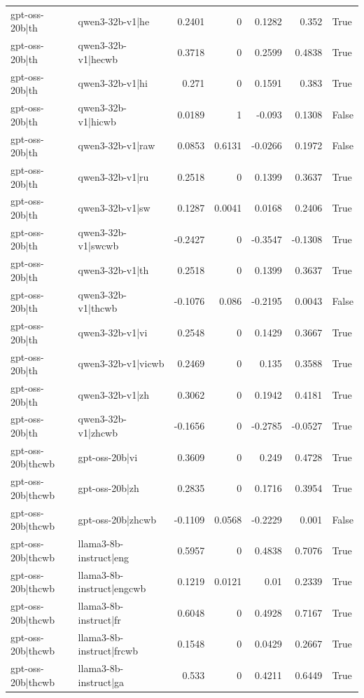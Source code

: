 \begin{table}
\begin{tabular}{l l r r r r l}
gpt-oss-20b|th & qwen3-32b-v1|he & 0.2401 & 0 & 0.1282 & 0.352 & True \\
gpt-oss-20b|th & qwen3-32b-v1|hecwb & 0.3718 & 0 & 0.2599 & 0.4838 & True \\
gpt-oss-20b|th & qwen3-32b-v1|hi & 0.271 & 0 & 0.1591 & 0.383 & True \\
gpt-oss-20b|th & qwen3-32b-v1|hicwb & 0.0189 & 1 & -0.093 & 0.1308 & False \\
gpt-oss-20b|th & qwen3-32b-v1|raw & 0.0853 & 0.6131 & -0.0266 & 0.1972 & False \\
gpt-oss-20b|th & qwen3-32b-v1|ru & 0.2518 & 0 & 0.1399 & 0.3637 & True \\
gpt-oss-20b|th & qwen3-32b-v1|sw & 0.1287 & 0.0041 & 0.0168 & 0.2406 & True \\
gpt-oss-20b|th & qwen3-32b-v1|swcwb & -0.2427 & 0 & -0.3547 & -0.1308 & True \\
gpt-oss-20b|th & qwen3-32b-v1|th & 0.2518 & 0 & 0.1399 & 0.3637 & True \\
gpt-oss-20b|th & qwen3-32b-v1|thcwb & -0.1076 & 0.086 & -0.2195 & 0.0043 & False \\
gpt-oss-20b|th & qwen3-32b-v1|vi & 0.2548 & 0 & 0.1429 & 0.3667 & True \\
gpt-oss-20b|th & qwen3-32b-v1|vicwb & 0.2469 & 0 & 0.135 & 0.3588 & True \\
gpt-oss-20b|th & qwen3-32b-v1|zh & 0.3062 & 0 & 0.1942 & 0.4181 & True \\
gpt-oss-20b|th & qwen3-32b-v1|zhcwb & -0.1656 & 0 & -0.2785 & -0.0527 & True \\
gpt-oss-20b|thcwb & gpt-oss-20b|vi & 0.3609 & 0 & 0.249 & 0.4728 & True \\
gpt-oss-20b|thcwb & gpt-oss-20b|zh & 0.2835 & 0 & 0.1716 & 0.3954 & True \\
gpt-oss-20b|thcwb & gpt-oss-20b|zhcwb & -0.1109 & 0.0568 & -0.2229 & 0.001 & False \\
gpt-oss-20b|thcwb & llama3-8b-instruct|eng & 0.5957 & 0 & 0.4838 & 0.7076 & True \\
gpt-oss-20b|thcwb & llama3-8b-instruct|engcwb & 0.1219 & 0.0121 & 0.01 & 0.2339 & True \\
gpt-oss-20b|thcwb & llama3-8b-instruct|fr & 0.6048 & 0 & 0.4928 & 0.7167 & True \\
gpt-oss-20b|thcwb & llama3-8b-instruct|frcwb & 0.1548 & 0 & 0.0429 & 0.2667 & True \\
gpt-oss-20b|thcwb & llama3-8b-instruct|ga & 0.533 & 0 & 0.4211 & 0.6449 & True \\

\end{tabular}
\end{table}
